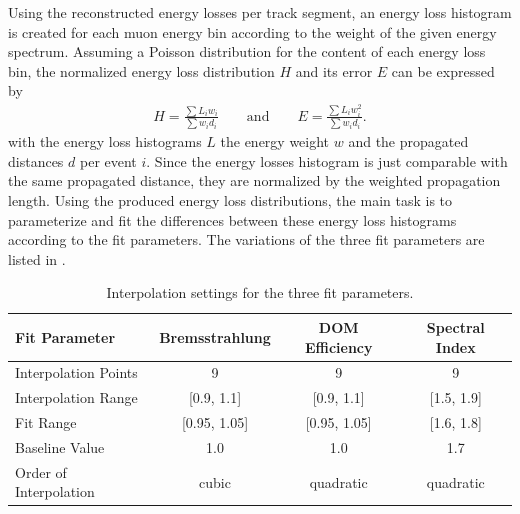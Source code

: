 Using the reconstructed energy losses per track segment, an energy loss histogram is created for each muon energy bin according to the weight of the given energy spectrum.
Assuming a Poisson distribution for the content of each energy loss bin, the normalized energy loss distribution $H$ and its error $E$ can be expressed by
\begin{align}
    H = \frac{\sum L_i w_i}{\sum w_i d_i}
    \qquad \text{and} \qquad
    E = \frac{\sum L_i w_i^2}{\sum w_i d_i}.
\end{align}
with the energy loss histograms $L$ the energy weight $w$ and the propagated distances $d$ per event $i$.
Since the energy losses histogram is just comparable with the same propagated distance, they are normalized by the weighted propagation length.
Using the produced energy loss distributions, the main task is to parameterize and fit the differences between these energy loss histograms according to the fit parameters.
The variations of the three fit parameters are listed in .
\begin{table}
    \caption{Interpolation settings for the three fit parameters.}
    \label{tab:study_interpol_set}
    \centering
    \begin{tabular}{l ccc}
        \toprule
        Fit Parameter & Bremsstrahlung & DOM Efficiency & Spectral Index \\
        \midrule
        Interpolation Points & 9 & 9 & 9 \\
        Interpolation Range & [0.9, 1.1] & [0.9, 1.1] & [1.5, 1.9] \\
        Fit Range & [0.95, 1.05] & [0.95, 1.05] & [1.6, 1.8] \\
        Baseline Value & 1.0 & 1.0 & 1.7 \\
        Order of Interpolation & cubic & quadratic & quadratic \\
        \bottomrule
    \end{tabular}
\end{table}

